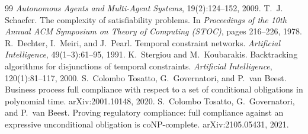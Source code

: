 \documentclass[11pt,a4paper]{article}
\begin{document}
\begin{thebibliography}{99}
\emph{Autonomous Agents and Multi-Agent Systems}, 19(2):124--152, 2009.
 T.~J. Schaefer. The complexity of satisfiability problems. In \emph{Proceedings of the 10th Annual ACM
Symposium on Theory of Computing (STOC)}, pages 216--226, 1978.
 R.~Dechter, I.~Meiri, and J.~Pearl. Temporal constraint networks. \emph{Artificial Intelligence},
49(1--3):61--95, 1991.
 K.~Stergiou and M.~Koubarakis. Backtracking algorithms for disjunctions of temporal constraints.
\emph{Artificial Intelligence}, 120(1):81--117, 2000.
 S.~Colombo Tosatto, G.~Governatori, and P.~van Beest. Business process full compliance with respect to a set
of conditional obligations in polynomial time. arXiv:2001.10148, 2020.
 S.~Colombo Tosatto, G.~Governatori, and P.~van Beest. Proving regulatory compliance: full compliance against
an expressive unconditional obligation is coNP-complete. arXiv:2105.05431, 2021.
\end{thebibliography}
\end{document}
